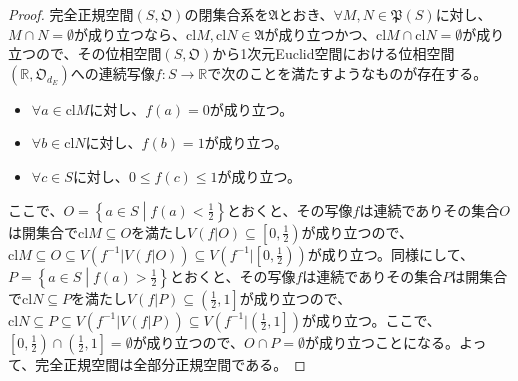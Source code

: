 \documentclass[dvipdfmx]{jsarticle}
\begin{document}
\begin{proof}
完全正規空間$\left( S,\mathfrak{O} \right)$の閉集合系を$\mathfrak{A}$とおき、$\forall M,N\in \mathfrak{P}(S)$に対し、$M \cap N = \emptyset$が成り立つなら、${\mathrm{cl}}M,{\mathrm{cl}}N\in \mathfrak{A}$が成り立つかつ、${\mathrm{cl}}M \cap {\mathrm{cl}}N = \emptyset$が成り立つので、その位相空間$\left( S,\mathfrak{O} \right)$から1次元Euclid空間における位相空間$\left( \mathbb{R},\mathfrak{O}_{d_{E}} \right)$への連続写像$f:S \rightarrow \mathbb{R}$で次のことを満たすようなものが存在する。
\begin{itemize}
\item
  $\forall a \in {\mathrm{cl}}M$に対し、$f(a) = 0$が成り立つ。
\item
  $\forall b \in {\mathrm{cl}}N$に対し、$f(b) = 1$が成り立つ。
\item
  $\forall c \in S$に対し、$0 \leq f(c) \leq 1$が成り立つ。
\end{itemize}
ここで、$O = \left\{ a \in S \middle| f(a) < \frac{1}{2} \right\}$とおくと、その写像$f$は連続でありその集合$O$は開集合で${\mathrm{cl}}M \subseteq O$を満たし$V\left( f|O \right) \subseteq \left[ 0,\frac{1}{2} \right)$が成り立つので、${\mathrm{cl}}M \subseteq O \subseteq V\left( f^{- 1}|V\left( f|O \right) \right) \subseteq V\left( f^{- 1}|\left[ 0,\frac{1}{2} \right) \right)$が成り立つ。同様にして、$P = \left\{ a \in S \middle| f(a) > \frac{1}{2} \right\}$とおくと、その写像$f$は連続でありその集合$P$は開集合で${\mathrm{cl}}N \subseteq P$を満たし$V\left( f|P \right) \subseteq \left( \frac{1}{2},1 \right]$が成り立つので、${\mathrm{cl}}N \subseteq P \subseteq V\left( f^{- 1}|V\left( f|P \right) \right) \subseteq V\left( f^{- 1}|\left( \frac{1}{2},1 \right] \right)$が成り立つ。ここで、$\left[ 0,\frac{1}{2} \right) \cap \left( \frac{1}{2},1 \right] = \emptyset$が成り立つので、$O \cap P = \emptyset$が成り立つことになる。よって、完全正規空間は全部分正規空間である。
\end{proof}
\end{document}
